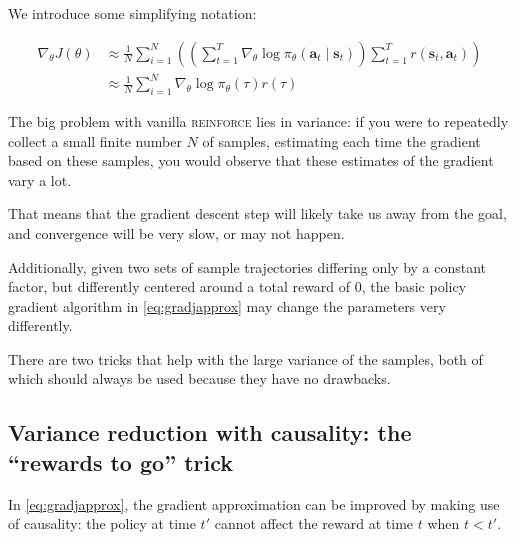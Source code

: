 \documentclass{article}
\begin{document}
We introduce some simplifying notation:

\begin{subequations}
  \begin{align}
    \nabla_\theta J(\theta) 
      &\approx \frac{1}{N} \sum_{i=1}^N\left(\left(\sum_{t=1}^T\nabla_\theta\log\pi_\theta\left(\mathbf{a}_t\mid \mathbf{s}_t\right)\right) \sum_{t=1}^T r\left(\mathbf{s}_t,\mathbf{a}_t\right)\right)\\
      &\approx \frac{1}{N} \sum_{i=1}^N\nabla_\theta\log\pi_\theta\left(\tau\right)r\left(\tau\right)
  \end{align}
\end{subequations}

The big problem with vanilla \textsc{reinforce} lies in variance: if you were to repeatedly collect a small finite number $N$ of samples, estimating each time the gradient based on these samples, you would observe that these estimates of the gradient vary a lot.

That means that the gradient descent step will likely take us away from the goal, and convergence will be very slow, or may not happen.

Additionally, given two sets of sample trajectories differing only by a constant factor, but differently centered around a total reward of 0, the basic policy gradient algorithm in \eqref{eq:gradjapprox} may change the parameters very differently. 


There are two tricks that help with the large variance of the samples, both of which should always be used because they have no drawbacks.

\subsection{Variance reduction with causality: the ``rewards to go'' trick}

In \eqref{eq:gradjapprox}, the gradient approximation can be improved by making use of causality: the policy at time $t'$ cannot affect the reward at time $t$ when $t < t'$.
\end{document}
